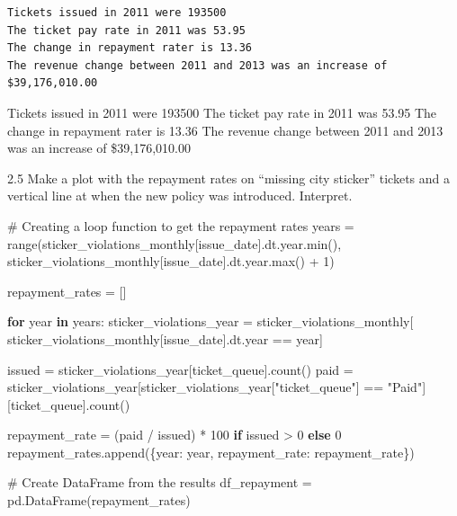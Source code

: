 \documentclass[
  letterpaper,
  DIV=11,
  numbers=noendperiod]{scrartcl}
\newenvironment{Shaded}{\begin{snugshade}}{\end{snugshade}}
\newcommand{\BuiltInTok}[1]{\textcolor[rgb]{0.00,0.23,0.31}{#1}}
\newcommand{\CommentTok}[1]{\textcolor[rgb]{0.37,0.37,0.37}{#1}}
\newcommand{\ControlFlowTok}[1]{\textcolor[rgb]{0.00,0.23,0.31}{\textbf{#1}}}
\newcommand{\DecValTok}[1]{\textcolor[rgb]{0.68,0.00,0.00}{#1}}
\newcommand{\KeywordTok}[1]{\textcolor[rgb]{0.00,0.23,0.31}{\textbf{#1}}}
\newcommand{\NormalTok}[1]{\textcolor[rgb]{0.00,0.23,0.31}{#1}}
\newcommand{\OperatorTok}[1]{\textcolor[rgb]{0.37,0.37,0.37}{#1}}
\newcommand{\StringTok}[1]{\textcolor[rgb]{0.13,0.47,0.30}{#1}}
\begin{document}
\begin{verbatim}
Tickets issued in 2011 were 193500
The ticket pay rate in 2011 was 53.95
The change in repayment rater is 13.36
The revenue change between 2011 and 2013 was an increase of $39,176,010.00
\end{verbatim}

Tickets issued in 2011 were 193500 The ticket pay rate in 2011 was 53.95
The change in repayment rater is 13.36 The revenue change between 2011
and 2013 was an increase of \$39,176,010.00

2.5 Make a plot with the repayment rates on ``missing city sticker''
tickets and a vertical line at when the new policy was introduced.
Interpret.

\begin{Shaded}
\begin{Highlighting}[]
\CommentTok{\# Creating a loop function to get the repayment rates}
\NormalTok{years }\OperatorTok{=} \BuiltInTok{range}\NormalTok{(sticker\_violations\_monthly[}\StringTok{\textquotesingle{}issue\_date\textquotesingle{}}\NormalTok{].dt.year.}\BuiltInTok{min}\NormalTok{(), }
\NormalTok{              sticker\_violations\_monthly[}\StringTok{\textquotesingle{}issue\_date\textquotesingle{}}\NormalTok{].dt.year.}\BuiltInTok{max}\NormalTok{() }\OperatorTok{+} \DecValTok{1}\NormalTok{)}

\NormalTok{repayment\_rates }\OperatorTok{=}\NormalTok{ []}

\ControlFlowTok{for}\NormalTok{ year }\KeywordTok{in}\NormalTok{ years:}
\NormalTok{    sticker\_violations\_year }\OperatorTok{=}\NormalTok{ sticker\_violations\_monthly[}
\NormalTok{        sticker\_violations\_monthly[}\StringTok{\textquotesingle{}issue\_date\textquotesingle{}}\NormalTok{].dt.year }\OperatorTok{==}\NormalTok{ year]}
    
\NormalTok{    issued }\OperatorTok{=}\NormalTok{ sticker\_violations\_year[}\StringTok{\textquotesingle{}ticket\_queue\textquotesingle{}}\NormalTok{].count()}
\NormalTok{    paid }\OperatorTok{=}\NormalTok{ sticker\_violations\_year[sticker\_violations\_year[}\StringTok{"ticket\_queue"}\NormalTok{] }\OperatorTok{==} \StringTok{"Paid"}\NormalTok{][}\StringTok{\textquotesingle{}ticket\_queue\textquotesingle{}}\NormalTok{].count()}
    
\NormalTok{    repayment\_rate }\OperatorTok{=}\NormalTok{ (paid }\OperatorTok{/}\NormalTok{ issued) }\OperatorTok{*} \DecValTok{100} \ControlFlowTok{if}\NormalTok{ issued }\OperatorTok{\textgreater{}} \DecValTok{0} \ControlFlowTok{else} \DecValTok{0}
\NormalTok{    repayment\_rates.append(\{}\StringTok{\textquotesingle{}year\textquotesingle{}}\NormalTok{: year, }\StringTok{\textquotesingle{}repayment\_rate\textquotesingle{}}\NormalTok{: repayment\_rate\})}

\CommentTok{\# Create DataFrame from the results}
\NormalTok{df\_repayment }\OperatorTok{=}\NormalTok{ pd.DataFrame(repayment\_rates)}
\end{Highlighting}
\end{Shaded}
\end{document}
